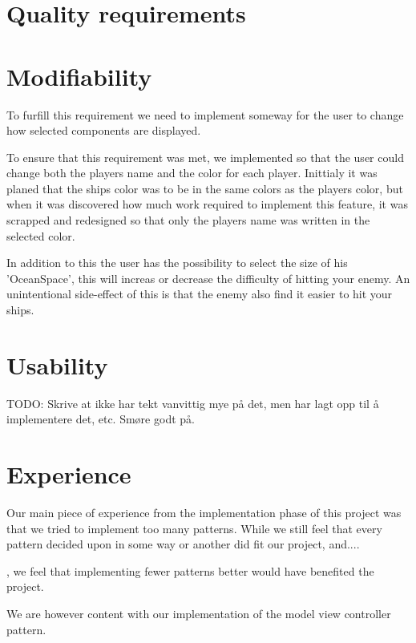 \section{Quality requirements}

\section{Modifiability}
To furfill this requirement we need to implement someway for the user to change how selected components are displayed.

To ensure that this requirement was met, we implemented so that the user could change both the players name and the color for each player. Inittialy it was planed that the ships color was to be in the same colors as the players color, but when it was discovered how much work required to implement this feature, it was scrapped and redesigned so that only the players name was written in the selected color.

In addition to this the user has the possibility to select the size of his 'OceanSpace', this will increas or decrease the difficulty of hitting your enemy. An unintentional side-effect of this is that the enemy also find it easier to hit your ships.


\section{Usability}
TODO: Skrive at ikke har tekt vanvittig mye på det, men har lagt opp til å implementere det, etc. Smøre godt på.




\section{Experience} %
Our main piece of experience from the implementation phase of this project was that we tried to implement too many patterns. While we still feel that every pattern decided upon in some way or another did fit our project, and.... 

, we feel that implementing fewer patterns better would have benefited the project.

We are however content with our implementation of the model view controller pattern.







